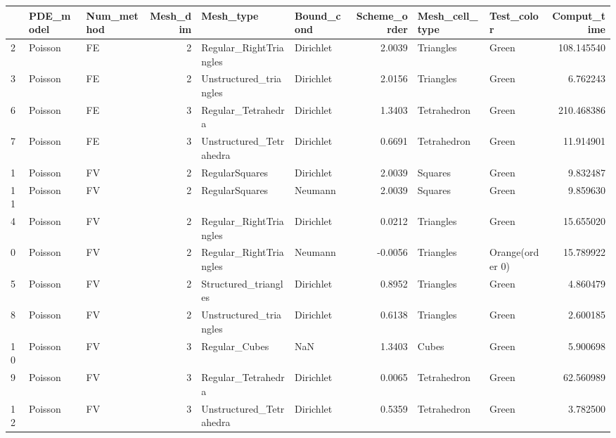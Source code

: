 \begin{tabular}{lllrllrllr}
\toprule
{} & PDE\_model & Num\_method &  Mesh\_dim &                Mesh\_type & Bound\_cond &  Scheme\_order & Mesh\_cell\_type &       Test\_color &  Comput\_time \\
\midrule
2  &   Poisson &         FE &         2 &   Regular\_RightTriangles &  Dirichlet &        2.0039 &      Triangles &            Green &   108.145540 \\
3  &   Poisson &         FE &         2 &   Unstructured\_triangles &  Dirichlet &        2.0156 &      Triangles &            Green &     6.762243 \\
6  &   Poisson &         FE &         3 &       Regular\_Tetrahedra &  Dirichlet &        1.3403 &    Tetrahedron &            Green &   210.468386 \\
7  &   Poisson &         FE &         3 &  Unstructured\_Tetrahedra &  Dirichlet &        0.6691 &    Tetrahedron &            Green &    11.914901 \\
1  &   Poisson &         FV &         2 &           RegularSquares &  Dirichlet &        2.0039 &        Squares &            Green &     9.832487 \\
11 &   Poisson &         FV &         2 &           RegularSquares &    Neumann &        2.0039 &        Squares &            Green &     9.859630 \\
4  &   Poisson &         FV &         2 &   Regular\_RightTriangles &  Dirichlet &        0.0212 &      Triangles &            Green &    15.655020 \\
0  &   Poisson &         FV &         2 &   Regular\_RightTriangles &    Neumann &       -0.0056 &      Triangles &  Orange(order 0) &    15.789922 \\
5  &   Poisson &         FV &         2 &     Structured\_triangles &  Dirichlet &        0.8952 &      Triangles &            Green &     4.860479 \\
8  &   Poisson &         FV &         2 &   Unstructured\_triangles &  Dirichlet &        0.6138 &      Triangles &            Green &     2.600185 \\
10 &   Poisson &         FV &         3 &            Regular\_Cubes &        NaN &        1.3403 &          Cubes &            Green &     5.900698 \\
9  &   Poisson &         FV &         3 &       Regular\_Tetrahedra &  Dirichlet &        0.0065 &    Tetrahedron &            Green &    62.560989 \\
12 &   Poisson &         FV &         3 &  Unstructured\_Tetrahedra &  Dirichlet &        0.5359 &    Tetrahedron &            Green &     3.782500 \\
\bottomrule
\end{tabular}
